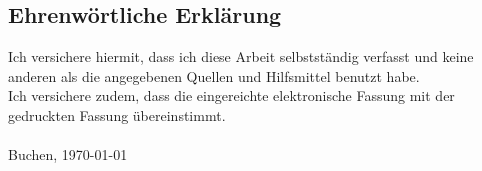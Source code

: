 \begin{titlepage}


    \chapter*{Ehrenw\"ortliche Erkl\"arung}

    \thispagestyle{empty}
    Ich versichere hiermit, dass ich diese Arbeit selbstständig verfasst und keine anderen als die angegebenen Quellen und Hilfsmittel benutzt habe. \\
    Ich versichere zudem, dass die eingereichte elektronische Fassung mit der gedruckten Fassung übereinstimmt.\\
    \\
    Buchen, \today
    \newpage
    \vspace{5mm}


\end{titlepage}
